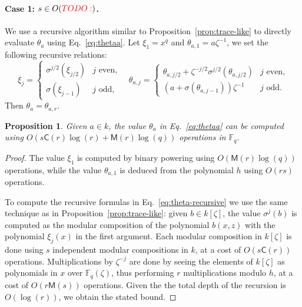 \documentclass[12pt]{article}
\theoremstyle{plain}
\newtheorem{proposition}[theorem]{Proposition}
\theoremstyle{definition}
\newcommand{\todo}[1]{\textcolor{red}{TODO: #1}}
\def\F{\ensuremath{\mathbb{F}}}
\def\MM{\ensuremath{\mathsf{M}}}
\def\CC{\ensuremath{\mathsf{C}}}
\newcounter{algorithm}
\begin{document}
\paragraph{Case 1: $s\in O(\todo{})$.}
We use a recursive algorithm similar to Proposition~\ref{prop:trace-like}
to directly evaluate $\theta_a$ using Eq.~\eqref{eq:thetaa}.
Let $\xi_1=x^q$ and $\theta_{a,1}=a\zeta^{-1}$,
we set the following recursive relations:
\begin{equation}
\label{eq:theta-recursive}
\xi_j = 
\begin{cases}
\sigma^{j/2}(\xi_{j / 2}) & j \text{ even,} \\
\sigma(\xi_{j - 1}) & j \text{ odd,}
\end{cases} \quad
\theta_{a, j} = 
\begin{cases}
\theta_{a, j / 2} + \zeta^{-j / 2}\sigma^{j / 2}(\theta_{a, j / 2})& j \text{ even,} \\
(a + \sigma(\theta_{a, j - 1}))\zeta^{-1} & j \text{ odd.}
\end{cases}
\end{equation}
Then $\theta_a=\theta_{a,r}$.

\begin{proposition}
  \label{prop:xitheta}
  Given $a\in k$, the value $\theta_a$ in Eq.~\eqref{eq:thetaa} can
  be computed using $O(s\CC(r)\log(r)+\MM(r)\log(q))$ operations in
  $\F_q$.
\end{proposition}
\begin{proof}
  The value $\xi_1$ is computed by binary powering using
  $O(\MM(r)\log(q))$ operations, while the value $\theta_{a,1}$ is
  deduced from the polynomial $h$ using $O(rs)$ operations.
  
  To compute the recursive formulas in Eq.~\eqref{eq:theta-recursive}
  we use the same technique as in Proposition~\ref{prop:trace-like}:
  given $b \in k[\zeta]$, the value $\sigma^j(b)$ is computed as the
  modular composition of the polynomial $b(x,z)$ with the polynomial
  $\xi_j(x)$ in the first argument. %
  Each modular composition in $k[\zeta]$ is done using $s$ independent
  modular compositions in $k$, at a cost of $O(s\CC(r))$ operations. %
  Multiplications by $\zeta^{-j}$ are done by seeing the elements of
  $k[\zeta]$ as polynomials in $x$ over $\F_q(\zeta)$, thus performing
  $r$ multiplications modulo $h$, at a cost of $O(r\MM(s))$
  operations. %
  Given the the total depth of the recursion is $O(\log(r))$, we
  obtain the stated bound.
\end{proof}
\end{document}
